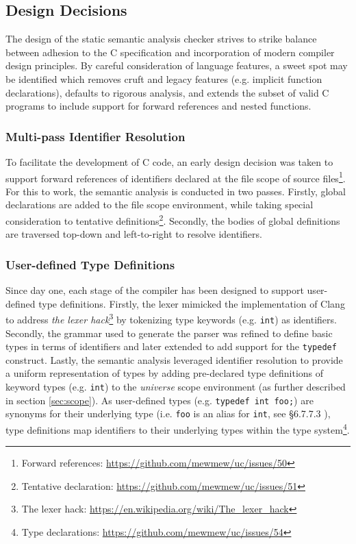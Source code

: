\subsection{Design Decisions}

The design of the static semantic analysis checker strives to strike balance between adhesion to the C specification and incorporation of modern compiler design principles. By careful consideration of language features, a sweet spot may be identified which removes cruft and legacy features (e.g. implicit function declarations), defaults to rigorous analysis, and extends the subset of valid C programs to include support for forward references and nested functions.

\subsubsection{Multi-pass Identifier Resolution}

To facilitate the development of C code, an early design decision was taken to support forward references of identifiers declared at the file scope of source files\footnote{Forward references: \url{https://github.com/mewmew/uc/issues/50}}. For this to work, the semantic analysis is conducted in two passes. Firstly, global declarations are added to the file scope environment, while taking special consideration to tentative definitions\footnote{Tentative declaration: \url{https://github.com/mewmew/uc/issues/51}}. Secondly, the bodies of global definitions are traversed top-down and left-to-right to resolve identifiers.

\subsubsection{User-defined Type Definitions}

Since day one, each stage of the compiler has been designed to support user-defined type definitions. Firstly, the lexer mimicked the implementation of Clang to address \textit{the lexer hack}\footnote{The lexer hack: \url{https://en.wikipedia.org/wiki/The_lexer_hack}} by tokenizing type keywords (e.g. \texttt{int}) as identifiers. Secondly, the grammar used to generate the parser was refined to define basic types in terms of identifiers and later extended to add support for the \texttt{typedef} construct. Lastly, the semantic analysis leveraged identifier resolution to provide a uniform representation of types by adding pre-declared type definitions of keyword types (e.g. \texttt{int}) to the \textit{universe} scope environment (as further described in section \ref{sec:scope}). As user-defined types (e.g. \texttt{typedef int foo;}) are synonyms for their underlying type (i.e. \texttt{foo} is an alias for \texttt{int}, see §6.7.7.3 \cite{c11_spec}), type definitions map identifiers to their underlying types within the type system\footnote{Type declarations: \url{https://github.com/mewmew/uc/issues/54}}.

